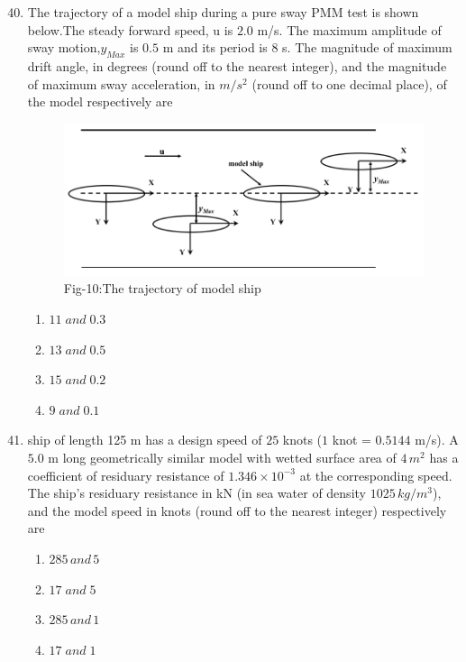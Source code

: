 \documentclass[journal]{IEEEtran}
\theoremstyle{remark}
\begin{document}
\begin{enumerate}[itemsep=1em]
\setcounter{enumi}{39}
\item The trajectory of a model ship during a pure sway PMM test is shown below.The steady forward speed, u is $2.0$ m/s. The maximum amplitude of sway motion,$y_{Max}$ is $0.5$ m and its period is $8$ s. The magnitude of maximum drift angle, in 
degrees (round off to the nearest integer), and the magnitude of maximum sway acceleration, in $m/s^2$ (round off to one decimal place), of the model respectively are
\begin{figure}[H]
    \centering
    \includegraphics[width=0.6\columnwidth]{figs/fig-10.jpeg}
    \caption*{Fig-10:The trajectory of model ship}
    \label{fig-10}
\end{figure}

\begin{multicols}{4}
\begin{enumerate}
    \item $11\;and\;0.3$ 
    \item $13\;and\;0.5$
    \item $15\;and\;0.2$
    \item $9\;and\;0.1$
\end{enumerate}
\end{multicols}

\end{enumerate}

\begin{enumerate}[itemsep=1em]
\setcounter{enumi}{40}
\item ship of length 125 m has a design speed of $25$ knots ($1$ knot = $0.5144$ m/s). A $5.0$ m long geometrically similar model with wetted surface area of $4\,m^2$ has a coefficient of residuary resistance of $1.346 \times 10^{-3}$ at the corresponding speed. The ship's residuary resistance in kN (in sea water of density $1025\,kg/m^3$), and the model speed in knots (round off to the nearest integer) respectively are 
\begin{multicols}{4}
\begin{enumerate}
    \item $285\,and\,5$
    \item $17\;and\;5$
    \item $285\,and\,1$
    \item $17\;and\;1$
    
\end{enumerate}
\end{multicols}
\end{enumerate}
\end{document}
